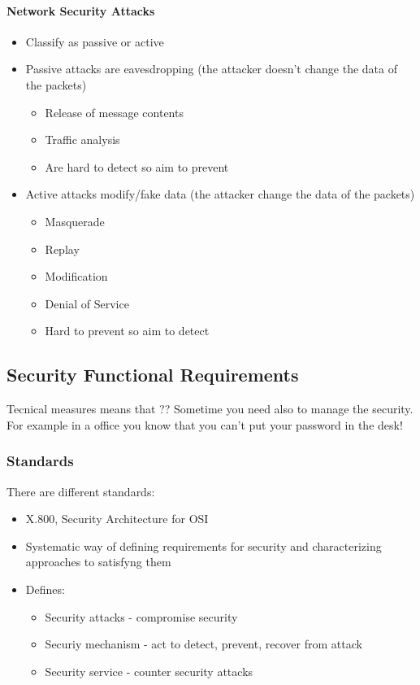 \paragraph*{Network Security Attacks}
\begin{itemize}
  \item Classify as passive or active
  \item Passive attacks are eavesdropping (the attacker doesn't change the data
of the packets)
  \begin{itemize}
    \item Release of message contents
    \item Traffic analysis
    \item Are hard to detect so aim to prevent
  \end{itemize}
  \item Active attacks modify/fake data (the attacker change the data of the
packets)
  \begin{itemize}
    \item Masquerade
    \item Replay
    \item Modification
    \item Denial of Service
    \item Hard to prevent so aim to detect
  \end{itemize}
\end{itemize}

\subsection{Security Functional Requirements}
Tecnical measures means that ??
Sometime you need also to manage the security. For example in a office you know
that you can't put your password in the desk!

\subsubsection{Standards}
There are different standards:
\begin{itemize}
  \item X.800, Security Architecture for OSI
  \item Systematic way of defining requirements for security and characterizing
approaches to satisfyng them
  \item Defines:
  \begin{itemize}
    \item Security attacks - compromise security
    \item Securiy mechanism - act to detect, prevent, recover from attack
    \item Security service - counter security attacks
  \end{itemize}
\end{itemize}

